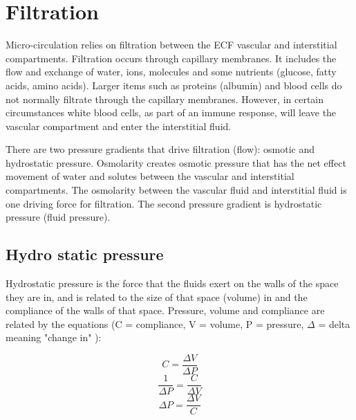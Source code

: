 \section{Filtration}

Micro-circulation relies on filtration between the ECF vascular and interstitial compartments. Filtration occurs through capillary membranes. It includes the flow and exchange of water, ions, molecules and some nutrients (glucose, fatty acids, amino acids). Larger items such as proteins (albumin) and blood cells do not normally filtrate through the capillary membranes. However, in certain circumstances white blood cells, as part of an immune response, will leave the vascular compartment and enter the interstitial fluid.

There are two pressure gradients that drive filtration (flow): osmotic and hydrostatic pressure. Osmolarity creates osmotic pressure that has the net effect movement of water and solutes between the vascular and interstitial compartments. The osmolarity between the vascular fluid and interstitial fluid is one driving force for filtration. The second pressure gradient is hydrostatic pressure (fluid pressure). 

\subsection{Hydro static pressure}
Hydrostatic pressure is the force that the fluids exert on the walls of the space they are in, and is related to the size of that space (volume) in and the compliance of the walls of that space.\footnotemark{} Pressure, volume and compliance are related by the equations (C = compliance, V = volume, P = pressure, $\Delta$ = delta meaning "change in" ):

\begin{equation}
    C = \frac{\Delta V}{\Delta P}
    \label{Compliance}
\end{equation}
\begin{equation}
    \frac{1}{\Delta P} = \frac{C}{\Delta V}
    \label{InversePressure}
\end{equation}
\begin{equation}
    \Delta P = \frac{\Delta V}{C}
    \label{Pressure}
\end{equation}

